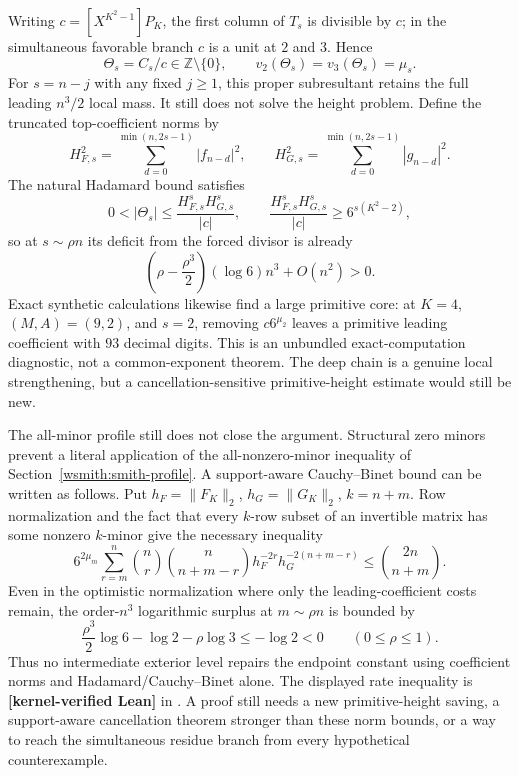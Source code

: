 \documentclass[11pt,oneside]{article}
\theoremstyle{definition}
\theoremstyle{remark}
\newcommand{\Z}{\mathbb Z}
\newcommand{\lean}[1]{\texttt{\detokenize{#1}}}
\newcommand{\statuslean}{\textcolor{leanblue}{\textbf{[kernel-verified Lean]}}}
\begin{document}
Writing $c=[X^{K^2-1}]P_K$, the first column of $T_s$ is divisible by $c$; in the simultaneous
favorable branch $c$ is a unit at $2$ and $3$.  Hence
\[
 \Theta_s=C_s/c\in\Z\setminus\{0\},\qquad
 v_2(\Theta_s)=v_3(\Theta_s)=\mu_s.
\]
For $s=n-j$ with any fixed $j\ge1$, this proper subresultant retains the full leading
$n^3/2$ local mass.  It still does not solve the height problem.  Define the truncated
top-coefficient norms by
\[
 H_{F,s}^2=\sum_{d=0}^{\min(n,2s-1)}|f_{n-d}|^2,\qquad
 H_{G,s}^2=\sum_{d=0}^{\min(n,2s-1)}|g_{n-d}|^2.
\]
The natural Hadamard bound satisfies
\[
 0<|\Theta_s|\le\frac{H_{F,s}^sH_{G,s}^s}{|c|},\qquad
 \frac{H_{F,s}^sH_{G,s}^s}{|c|}\ge6^{s(K^2-2)},
\]
so at $s\sim\rho n$ its deficit from the forced divisor is already
\[
 \left(\rho-\frac{\rho^3}{2}\right)(\log6)n^3+O(n^2)>0.
\]
Exact synthetic calculations likewise find a large primitive core: at $K=4$, $(M,A)=(9,2)$,
and $s=2$, removing $c6^{\mu_2}$ leaves a primitive leading coefficient with $93$ decimal
digits.  This is an unbundled exact-computation diagnostic, not a common-exponent theorem.
The deep chain is a genuine local strengthening, but a cancellation-sensitive primitive-height
estimate would still be new.

The all-minor profile still does not close the argument.  Structural zero minors prevent a
literal application of the all-nonzero-minor inequality of Section~\ref{wsmith:smith-profile}.
A support-aware Cauchy--Binet bound can be written as follows.  Put
$h_F=\lVert F_K\rVert_2$, $h_G=\lVert G_K\rVert_2$, $k=n+m$.  Row normalization and the fact
that every $k$-row subset of an invertible matrix has some nonzero $k$-minor give the necessary
inequality
\begin{equation}
 6^{2\mu_m}\sum_{r=m}^{n}
 \binom nr\binom n{n+m-r}h_F^{-2r}h_G^{-2(n+m-r)}
 \le \binom{2n}{n+m}.
 \label{res:eq-cross-support-aware-bound}
\end{equation}
Even in the optimistic normalization where only the leading-coefficient costs remain, the
order-$n^3$ logarithmic surplus at $m\sim\rho n$ is bounded by
\begin{equation}
 \frac{\rho^3}{2}\log6-\log2-\rho\log3\le-\log2<0
 \qquad(0\le\rho\le1).
 \label{res:eq-cross-compound-deficit}
\end{equation}
Thus no intermediate exterior level repairs the endpoint constant using coefficient norms
and Hadamard/Cauchy--Binet alone.  The displayed rate inequality is \statuslean{} in
\lean{CompoundEndpointRate}.  A proof still needs a new primitive-height saving, a
support-aware cancellation theorem stronger than these norm bounds, or a way to reach the
simultaneous residue branch from every hypothetical counterexample.
\end{document}
